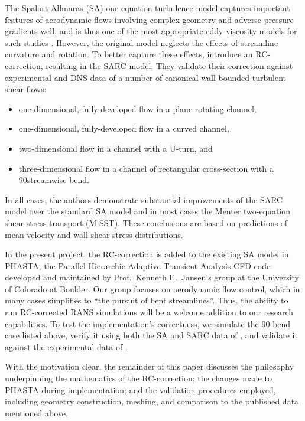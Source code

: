 \documentclass[11pt]{article}
\begin{document}
The Spalart-Allmaras (SA) one equation turbulence model captures important features of aerodynamic flows involving complex geometry and adverse pressure gradients well, and is thus one of the most appropriate eddy-viscosity models for such studies \citep{spalart1992}. However, the original model neglects the effects of streamline curvature and rotation. To better capture these effects, \citet{shur2000} introduce an RC-correction, resulting in the SARC model. They validate their correction against experimental and DNS data of a number of canonical wall-bounded turbulent shear flows: 
\begin{itemize}
\item one-dimensional, fully-developed flow in a plane rotating channel,
\item one-dimensional, fully-developed flow in a curved channel,
\item two-dimensional flow in a channel with a U-turn, and
\item three-dimensional flow in a channel of rectangular cross-section with a 90\degree streamwise bend.
\end{itemize}
In all cases, the authors demonstrate substantial improvements of the SARC model over the standard SA model and in most cases the Menter two-equation shear stress transport (M-SST). These conclusions are based on predictions of mean velocity and wall shear stress distributions.

In the present project, the \citet{shur2000} RC-correction is added to the existing SA model in PHASTA, the Parallel Hierarchic Adaptive Transient Analysis CFD code developed and maintained by Prof.\ Kenneth E.\ Jansen's group at the University of Colorado at Boulder. Our group focuses on aerodynamic flow control, which in many cases simplifies to ``the pursuit of bent streamlines''. Thus, the ability to run RC-corrected RANS simulations will be a welcome addition to our research capabilities. To test the implementation's correctness, we simulate the 90\degree-bend case listed above, verify it using both the SA and SARC data of \citet{shur2000}, and validate it against the experimental data of \citet{kim1994}.

With the motivation clear, the remainder of this paper discusses the philosophy underpinning the mathematics of the RC-correction; the changes made to PHASTA during implementation; and the validation procedures employed, including geometry construction, meshing, and comparison to the published data mentioned above.
\end{document}
